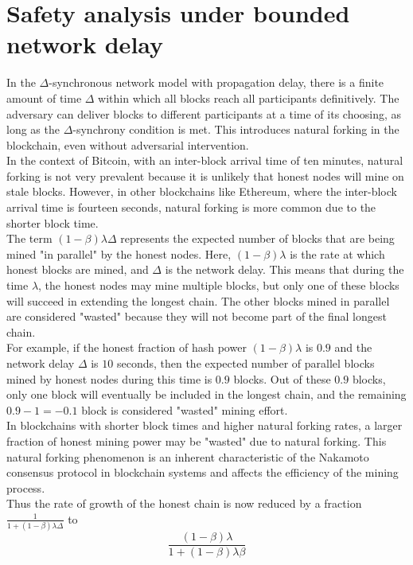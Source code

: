 \documentclass{report}
\begin{document}
\section{Safety analysis under bounded network delay}
In the $\Delta$-synchronous network model with propagation delay, there is a finite amount of time $\Delta$ within which all blocks reach all participants definitively. The adversary can deliver blocks to different participants at a time of its choosing, as long as the $\Delta$-synchrony condition is met. This introduces natural forking in the blockchain, even without adversarial intervention.\\
In the context of Bitcoin, with an inter-block arrival time of ten minutes, natural forking is not very prevalent because it is unlikely that honest nodes will mine on stale blocks. However, in other blockchains like Ethereum, where the inter-block arrival time is fourteen seconds, natural forking is more common due to the shorter block time.\\
The term $(1 - \beta)\lambda\Delta$ represents the expected number of blocks that are being mined "in parallel" by the honest nodes. Here, $(1 - \beta)\lambda$ is the rate at which honest blocks are mined, and $\Delta$ is the network delay. This means that during the time $\lambda$, the honest nodes may mine multiple blocks, but only one of these blocks will succeed in extending the longest chain. The other blocks mined in parallel are considered "wasted" because they will not become part of the final longest chain.\\
For example, if the honest fraction of hash power $(1 - \beta)\lambda$ is $0.9$ and the network delay $\Delta$ is $10$ seconds, then the expected number of parallel blocks mined by honest nodes during this time is $0.9$ blocks. Out of these $0.9$ blocks, only one block will eventually be included in the longest chain, and the remaining $0.9 - 1 = -0.1$ block is considered "wasted" mining effort.\\
In blockchains with shorter block times and higher natural forking rates, a larger fraction of honest mining power may be "wasted" due to natural forking. This natural forking phenomenon is an inherent characteristic of the Nakamoto consensus protocol in blockchain systems and affects the efficiency of the mining process.\\
Thus the rate of growth of the honest chain is now reduced by a fraction $\frac{1}{1+(1 - \beta)\lambda\Delta}$ to
\begin{equation*}
	\frac{(1 - \beta) \lambda}{1 + (1 - \beta) \lambda \beta}
\end{equation*}
\end{document}
